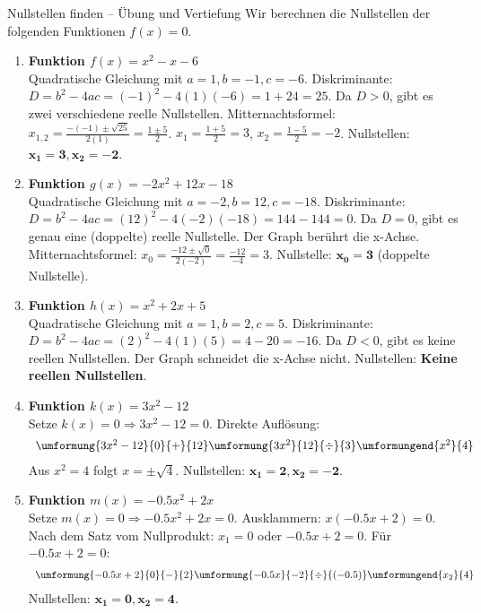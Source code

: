 \begin{loesungsumgebung}{Nullstellen finden – Übung und Vertiefung}
Wir berechnen die Nullstellen der folgenden Funktionen $f(x)=0$.

\begin{enumerate}[label=(\alph*)]
    \item \textbf{Funktion $f(x) = x^2 - x - 6$} \\
    Quadratische Gleichung mit $a=1, b=-1, c=-6$.
    Diskriminante: $D = b^2 - 4ac = (-1)^2 - 4(1)(-6) = 1 + 24 = 25$.
    Da $D > 0$, gibt es zwei verschiedene reelle Nullstellen.
    Mitternachtsformel: $x_{1,2} = \frac{-(-1) \pm \sqrt{25}}{2(1)} = \frac{1 \pm 5}{2}$.
    $x_1 = \frac{1+5}{2} = 3$, $x_2 = \frac{1-5}{2} = -2$.
    Nullstellen: $\mathbf{x_1=3, x_2=-2}$.

    \item \textbf{Funktion $g(x) = -2x^2 + 12x - 18$} \\
    Quadratische Gleichung mit $a=-2, b=12, c=-18$.
    Diskriminante: $D = b^2 - 4ac = (12)^2 - 4(-2)(-18) = 144 - 144 = 0$.
    Da $D=0$, gibt es genau eine (doppelte) reelle Nullstelle. Der Graph berührt die x-Achse.
    Mitternachtsformel: $x_0 = \frac{-12 \pm \sqrt{0}}{2(-2)} = \frac{-12}{-4} = 3$.
    Nullstelle: $\mathbf{x_0=3}$ (doppelte Nullstelle).

    \item \textbf{Funktion $h(x) = x^2 + 2x + 5$} \\
    Quadratische Gleichung mit $a=1, b=2, c=5$.
    Diskriminante: $D = b^2 - 4ac = (2)^2 - 4(1)(5) = 4 - 20 = -16$.
    Da $D < 0$, gibt es keine reellen Nullstellen. Der Graph schneidet die x-Achse nicht.
    Nullstellen: \textbf{Keine reellen Nullstellen}.

    \item \textbf{Funktion $k(x) = 3x^2 - 12$} \\
    Setze $k(x)=0 \Rightarrow 3x^2 - 12 = 0$. Direkte Auflösung:
    $$
    \begin{array}{r c l c l}
    \umformung{3x^2 - 12}{0}{+}{12}
    \umformung{3x^2}{12}{\div}{3}
    \umformungend{x^2}{4}
    \end{array}
    $$
    Aus $x^2=4$ folgt $x = \pm\sqrt{4}$.
    Nullstellen: $\mathbf{x_1=2, x_2=-2}$.

    \item \textbf{Funktion $m(x) = -0.5x^2 + 2x$} \\
    Setze $m(x)=0 \Rightarrow -0.5x^2 + 2x = 0$. Ausklammern:
    $x(-0.5x + 2) = 0$.
    Nach dem Satz vom Nullprodukt:
    $x_1 = 0$ oder $-0.5x + 2 = 0$.
    Für $-0.5x + 2 = 0$:
    $$
    \begin{array}{r c l c l}
    \umformung{-0.5x + 2}{0}{-}{2}
    \umformung{-0.5x}{-2}{\div}{(-0.5)}
    \umformungend{x_2}{4}
    \end{array}
    $$
    Nullstellen: $\mathbf{x_1=0, x_2=4}$.


\end{enumerate}
\end{loesungsumgebung}
